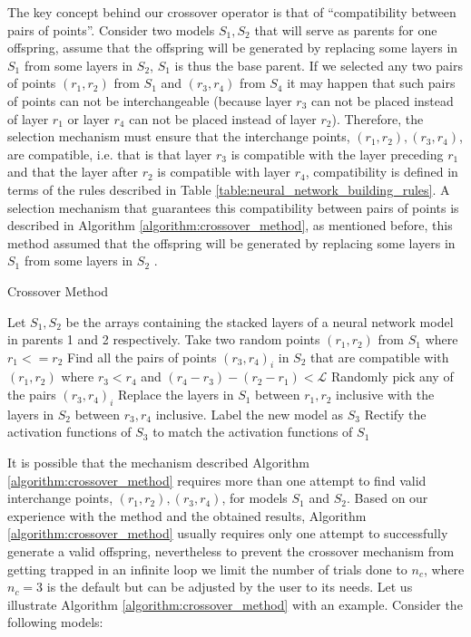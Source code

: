 \documentclass[journal]{IEEEtran}
\begin{document}
The key concept behind our crossover operator is that of  ``compatibility between pairs of points''. Consider two models $S_1, S_2$ that will serve as parents for one offspring, assume that the offspring will be generated by replacing some layers in $S_1$ from some layers in $S_2$, $S_1$ is thus the base parent. If we selected any two pairs of points $(r_1, r_2)$ from $S_1$ and $(r_3, r_4)$ from $S_4$ it may happen that such pairs of points can not be interchangeable (because layer $r_3$ can not be placed instead of layer $r_1$ or layer $r_4$ can not be placed instead of layer $r_2$). Therefore, the selection mechanism must ensure that the interchange points, $(r_1, r_2), (r_3, r_4)$, are compatible, i.e. that is that layer $r_3$ is compatible with the layer preceding $r_1$ and that the layer after $r_2$ is compatible with layer $r_4$, compatibility is defined in terms of the rules described in Table \ref{table:neural_network_building_rules}. A selection mechanism that guarantees this compatibility between pairs of points is described in Algorithm \ref{algorithm:crossover_method}, as mentioned before, this method assumed that the offspring will be generated by replacing some layers in $S_1$ from some layers in $S_2$ .

\begin{algorithm}[!htb]
\caption{Crossover Method}
\begin{algorithmic}
\State Let $S_1, S_2$ be the arrays containing the stacked layers of a neural network model in parents 1 and 2 respectively.
\State Take two random points $(r_1, r_2)$ from $S_1$ where $r_1 <= r_2 $
\Else 
\EndIf
\State Find all the pairs of points $(r_3, r_4)_i$ in $S_2$ that are compatible with $(r_1, r_2)$ where $r_3 < r_4$ and $(r_4 - r_3) - (r_2 - r_1) < \mathcal{L}$
\State Randomly pick any of the pairs $(r_3, r_4)_i$
\State Replace the layers in $S_1$ between $r_1, r_2$ inclusive with the layers in $S_2$ between $r_3, r_4$ inclusive. Label the new model as $S_3$
\State Rectify the activation functions of $S_3$ to match the activation functions of $S_1$
\end{algorithmic}
\label{algorithm:crossover_method}
\end{algorithm}

It is possible that the mechanism described Algorithm \ref{algorithm:crossover_method} requires more than one attempt to find valid interchange points, $(r_1, r_2), (r_3, r_4)$, for models $S_1$ and $S_2$. Based on our experience with the method and the obtained results,  Algorithm \ref{algorithm:crossover_method} usually requires only one attempt to successfully generate a valid offspring, nevertheless to prevent the crossover mechanism from getting trapped in an infinite loop we limit the number of trials done to $n_c$, where $n_c=3$ is the default but can be adjusted by the user to its needs. Let us illustrate Algorithm \ref{algorithm:crossover_method} with an example. Consider the following models:
\end{document}
